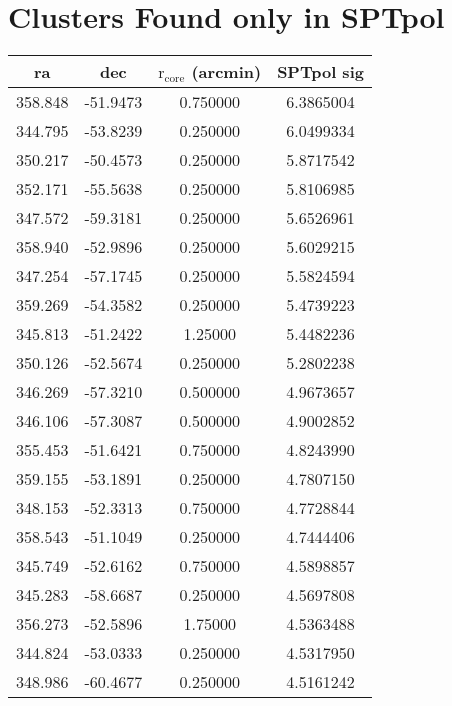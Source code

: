 \documentclass{article}
\begin{document}
\section{Clusters Found only in SPTpol}
\begin{tabular}{| c | c | c | c |}
  \hline
  ra & dec & $\mathrm{r}_\mathrm{core}$ (arcmin) & SPTpol sig\\
  \hline
      358.848 &      -51.9473 &      0.750000 &        6.3865004\\
      344.795 &      -53.8239 &      0.250000 &        6.0499334\\
      350.217 &      -50.4573 &      0.250000 &        5.8717542\\
      352.171 &      -55.5638 &      0.250000 &        5.8106985\\
      347.572 &      -59.3181 &      0.250000 &        5.6526961\\
      358.940 &      -52.9896 &      0.250000 &        5.6029215\\
      347.254 &      -57.1745 &      0.250000 &        5.5824594\\
      359.269 &      -54.3582 &      0.250000 &        5.4739223\\
      345.813 &      -51.2422 &       1.25000 &        5.4482236\\
      350.126 &      -52.5674 &      0.250000 &        5.2802238\\
      346.269 &      -57.3210 &      0.500000 &        4.9673657\\
      346.106 &      -57.3087 &      0.500000 &        4.9002852\\
      355.453 &      -51.6421 &      0.750000 &        4.8243990\\
      359.155 &      -53.1891 &      0.250000 &        4.7807150\\
      348.153 &      -52.3313 &      0.750000 &        4.7728844\\
      358.543 &      -51.1049 &      0.250000 &        4.7444406\\
      345.749 &      -52.6162 &      0.750000 &        4.5898857\\
      345.283 &      -58.6687 &      0.250000 &        4.5697808\\
      356.273 &      -52.5896 &       1.75000 &        4.5363488\\
      344.824 &      -53.0333 &      0.250000 &        4.5317950\\
      348.986 &      -60.4677 &      0.250000 &        4.5161242\\

\end{tabular}
\end{document}
